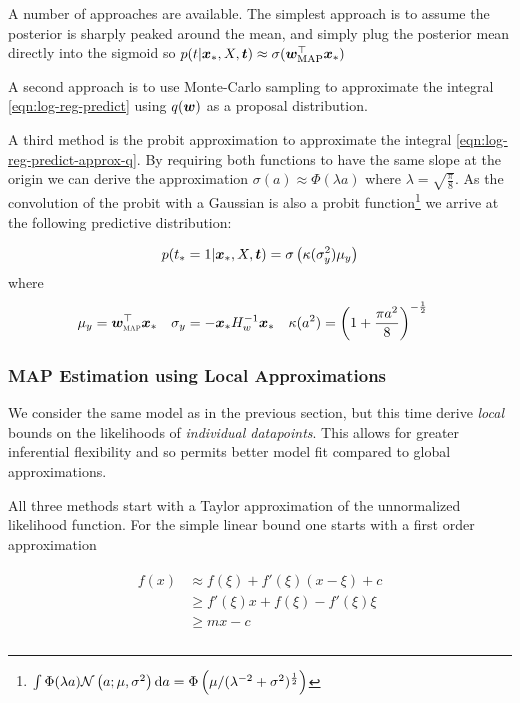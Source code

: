 A number of approaches are available. The simplest approach is to assume the posterior is sharply peaked around the mean, and simply plug the posterior mean directly into the sigmoid so $p(t|\bm x_*, X, \bm t) \approx \sigma(\bm w_{\text{MAP}}^\top \bm x_*)$

A second approach is to use Monte-Carlo sampling to approximate the integral \eqref{eqn:log-reg-predict} using $q(\bm w)$ as a proposal distribution.

A third method is the probit approximation\cite{Barber1998} to approximate the integral \eqref{eqn:log-reg-predict-approx-q}. By requiring both functions to have the same slope at the origin we can derive the approximation $\sigma(a) \approx \Phi(\lambda a)$ where $\lambda = \sqrt{\frac{\pi}{8}}$. As the convolution of the probit with a Gaussian is also a probit function\footnote{$\int \Phi(\lambda a)\mathcal{N} \left(a; \mu, \sigma^2\right) \text{d}a = \Phi\left(\mu / (\lambda^{-2} + \sigma^2)^{\frac{1}{2}} \right)$} we arrive at the following predictive distribution:


\begin{align}
p(t_* = 1 | \bm x_*, X, \bm t) = \sigma\left( \kappa(\sigma_y^2) \mu_y \right)
\end{align}
where
\begin{align}
\mu_y       & = \bm w_{\text{\tiny \sc MAP}}^\top\bm x_* &
\sigma_y    & = -\bm x_* {H}^{-1}_{w} \bm x_* &
\kappa(a^2) & = \left( 1 + \frac{\pi a^2}{8}  \right)^{-\frac{1}{2}}
\end{align}

\subsubsection*{MAP Estimation using Local Approximations}

We consider the same model as in the previous section, but this time derive \emph{local} bounds on the likelihoods of \emph{individual datapoints}. This allows for greater inferential flexibility and so permits better model fit compared to global approximations\cite{Jaakkola1997}.

All three methods start with a Taylor approximation of the unnormalized likelihood function. For the simple linear bound one starts with a first order approximation

\begin{align}
\begin{split}
f(x) & \approx f(\xi) + f'(\xi) (x - \xi) + c \\
 & \geq f'(\xi) x + f(\xi) - f'(\xi)\xi \\
 & \geq m x - c \\
\end{split}
\end{align}

